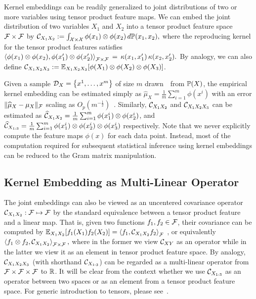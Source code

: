 \documentclass{article}
\newcommand{\hmu}{\widehat{\mu}}
\begin{document}
Kernel embeddings can be readily generalized to joint distributions of two or more variables using tensor product feature maps. We can embed the joint distribution of two variables $X_1$ and $X_2$ into a tensor product feature space $\mathcal{F}\times \mathcal{F}$ by
$
    \mathcal{C}_{X_1X_2} :=
    \int_{\mathcal{X} \times \mathcal{X}} \phi(x_1) \otimes \phi(x_2) \, d\mathbb{P}(x_1, x_2),
$
where the reproducing kernel for the tensor product features satisfies
$
	\left\langle \phi(x_1)\otimes \phi(x_2) ,\phi(x_1')\otimes \phi(x_2')  \right\rangle_{\mathcal{F}\times \mathcal{F}} \, = \,  \kappa(x_1,x_1')\,\kappa(x_2,x_2').
$
By analogy, we can also define $\mathcal{C}_{X_1X_2X_3} := \mathbb{E}_{X_1X_2X_3}[\phi(X_1)\otimes\phi(X_2)\otimes \phi(X_3)]$.

Given a sample $\mathcal{D}_{X} = \left\{x^1, \ldots, x^m\right\}$ of size $m$ drawn~\iid~from $\mathbb{P}(X)$, the empirical kernel embedding can be estimated simply as
$\hmu_{X} = \frac{1}{m} \sum\nolimits_{i=1}^m \phi(x^i)$ with an error $\|\hmu_X - \mu_X \|_{\Fcal}$ scaling as $O_p(m^{-\frac{1}{2}})$~\cite{SmoGreSonSch07}.
Similarly, $\mathcal{C}_{X_1X_2}$ and $\mathcal{C}_{X_1X_2X_3}$ can be estimated as
$
 \widehat {\mathcal{C}}_{X_1X_2} =\frac{1}{m}\sum\nolimits_{i=1}^m \phi(x_1^i) \otimes \phi(x_2^i)
$, and
$\widehat {\mathcal{C}}_{X_{1:3}} = \frac{1}{m} \sum_{i = 1}^m \phi(x_1^i) \otimes \phi(x_2^i) \otimes \phi(x_3^i)$ respectively.
Note that we never explicitly compute the feature maps $\phi(x)$ for each data point. Instead, most of the computation required for subsequent statistical inference using kernel embeddings can be reduced to the Gram matrix manipulation.

\vspace{-3mm}
\subsection{Kernel Embedding as Multi-Linear Operator}
\vspace{-2mm}

The joint embeddings can also be viewed as an uncentered covariance operator $\mathcal{C}_{X_1X_2}:\mathcal{F}\mapsto \mathcal{F}$ by the standard equivalence between a tensor product feature and a linear map.
That is, given two functions $f_1,f_2\in\mathcal{F}$, their covariance can be computed by
$
    \mathbb{E}_{X_1X_2}[f_1(X_1)f_2(X_2)]=\left\langle f_1,\mathcal{C}_{X_1X_2} f_2 \right\rangle_{\mathcal{F}}
$
, or equivalently
$
\left\langle f_1\otimes f_2,\mathcal{C}_{X_1X_2} \right\rangle_{\mathcal{F}\times\mathcal{F}},
$
where in the former we view $\mathcal{C}_{XY}$ as an operator while in the latter we view it as an element in tensor product feature space.
By analogy, $\mathcal{C}_{X_1X_2X_3}$ (with shorthand $\mathcal{C}_{X_{1:3}}$) can be regarded as a multi-linear operator from $\mathcal{F}\times\mathcal{F}\times\mathcal{F}$ to $\mathbb{R}$.
It will be clear from the context whether we use $\mathcal{C}_{X_{1:3}}$ as an operator between two spaces or as an element from a tensor product feature space. For generic introduction to tensors, please see~\cite{KolBad09}.
\end{document}
